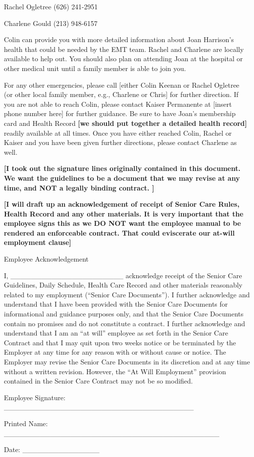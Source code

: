 \documentclass[]{article}
\begin{document}
Rachel Ogletree (626) 241-2951

Charlene Gould (213) 948-6157

Colin can provide you with more detailed information about Joan
Harrison's health that could be needed by the EMT team. Rachel and
Charlene are locally available to help out. You should also plan on
attending Joan at the hospital or other medical unit until a family
member is able to join you.

For any other emergencies, please call {[}either Colin Keenan or Rachel
Ogletree (or other local family member, e.g., Charlene or Chris{]} for
further direction. If you are not able to reach Colin, please contact
Kaiser Permanente at {[}insert phone number here{]} for further
guidance. Be sure to have Joan's membership card and Health Record
\textbf{{[}we should put together a detailed health record{]}} readily
available at all times. Once you have either reached Colin, Rachel or
Kaiser and you have been given further directions, please contact
Charlene as well.

\textbf{{[}I took out the signature lines originally contained in this
document. We want the guidelines to be a document that we may revise at
any time, and NOT a legally binding contract. {]}\\}

\textbf{{[}I will draft up an acknowledgement of receipt of Senior Care
Rules, Health Record and any other materials. It is very important that
the employee signs this as we DO NOT want the employee manual to be
rendered an enforceable contract. That could eviscerate our at-will
employment clause{]} }

Employee Acknowledgement

I, \_\_\_\_\_\_\_\_\_\_\_\_\_\_\_\_\_\_\_\_\_\_ acknowledge receipt of
the Senior Care Guidelines, Daily Schedule, Health Care Record and other
materials reasonably related to my employment (``Senior Care
Documents''). I further acknowledge and understand that I have been
provided with the Senior Care Documents for informational and guidance
purposes only, and that the Senior Care Documents contain no promises
and do not constitute a contract. I further acknowledge and understand
that I am an ``at will'' employee as set forth in the Senior Care
Contract and that I may quit upon two weeks notice or be terminated by
the Employer at any time for any reason with or without cause or notice.
The Employer may revise the Senior Care Documents in its discretion and
at any time without a written revision. However, the ``At Will
Employment'' provision contained in the Senior Care Contract may not be
so modified.

Employee Signature:
\_\_\_\_\_\_\_\_\_\_\_\_\_\_\_\_\_\_\_\_\_\_\_\_\_\_\_\_\_\_\_\_\_\_\_\_\_

Printed Name:
\_\_\_\_\_\_\_\_\_\_\_\_\_\_\_\_\_\_\_\_\_\_\_\_\_\_\_\_\_\_\_\_\_\_\_\_\_\_\_\_\_\_

Date: \_\_\_\_\_\_\_\_\_\_\_\_\_\_\_
\end{document}
